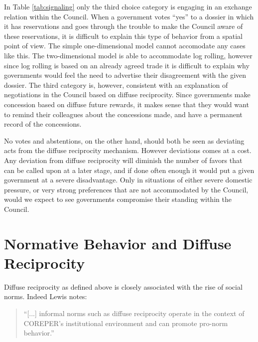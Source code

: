In Table \ref{tab:signaling} only the third choice category is engaging in an exchange relation within the Council. When a government votes ``yes'' to a dossier in which it has reservations and goes through the trouble to make the Council aware of these reservations, it is difficult to explain this type of behavior from a spatial point of view. The simple one-dimensional model cannot accomodate any cases like this. The two-dimensional model is able to accommodate log rolling, however since log rolling is based on an already agreed trade it is difficult to explain why governments would feel the need to advertise their disagreement with the given dossier. The third category is, however, consistent with an explanation of negotiations in the Council based on diffuse reciprocity. Since governments make concession based on diffuse future rewards, it makes sense that they would want to remind their colleagues about the concessions made, and have a permanent record of the concessions. 
 
No votes and abstentions, on the other hand, should both be seen as deviating acts from the diffuse reciprocity mechanism. However deviations comes at a cost. Any deviation from diffuse reciprocity will diminish the number of favors that can be called upon at a later stage, and if done often enough it would put a given government at a severe disadvantage. Only in situations of either severe domestic pressure, or very strong preferences that are not accommodated by the Council, would we expect to see governments compromise their standing within the Council. 




\section{Normative Behavior and Diffuse Reciprocity}

Diffuse reciprocity as defined above is closely associated with the rise of social norms. Indeed Lewis notes:

\begin{quote}
  ``[...] informal norms such as diffuse reciprocity operate in the context of COREPER's institutional environment and can promote pro-norm behavior.''
\end{quote}

